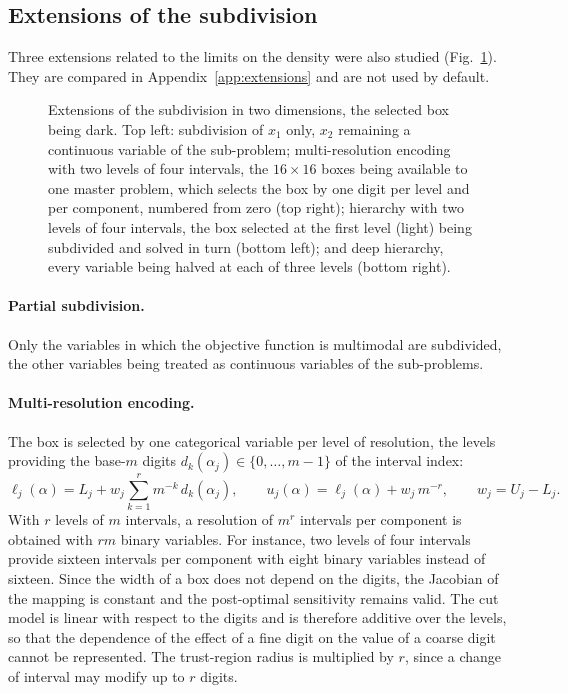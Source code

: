 \documentclass[pdflatex,sn-basic]{sn-jnl}
\newenvironment{appendices}{\appendix}{}
\begin{document}
\begin{appendices}
\subsection{Extensions of the subdivision}\label{sec:extensions}

Three extensions related to the limits on the density were also studied
(Fig.~\ref{fig:subdivision-variants}). They are compared in
Appendix~\ref{app:extensions} and are not used by default.

\begin{figure}[t]
  \centering
  
  \caption{Extensions of the subdivision in two dimensions, the selected box
    being dark. Top left: subdivision of $x_1$ only, $x_2$ remaining a
    continuous variable of the sub-problem; multi-resolution encoding with two
    levels of four intervals, the $16 \times 16$ boxes being available to one
    master problem, which selects the box by one digit per level and per
    component, numbered from zero (top right); hierarchy with two levels of four
    intervals, the box selected at the first level (light) being subdivided and
    solved in turn (bottom left); and deep hierarchy, every variable being
    halved at each of three levels (bottom right).}
  \label{fig:subdivision-variants}
\end{figure}

\paragraph{Partial subdivision.} Only the variables in which the objective
function is multimodal are subdivided, the other variables being treated as
continuous variables of the sub-problems.

\paragraph{Multi-resolution encoding.} The box is selected by one categorical
variable per level of resolution, the levels providing the base-$m$ digits
$d_k(\alpha_j) \in \{0,\dots,m-1\}$ of the interval index:
\begin{equation}\label{eq:multires}
  \ell_j(\alpha) = L_j + w_j \sum_{k=1}^{r} m^{-k}\, d_k(\alpha_j),
  \qquad
  u_j(\alpha) = \ell_j(\alpha) + w_j\, m^{-r},
  \qquad w_j = U_j - L_j .
\end{equation}
With $r$ levels of $m$ intervals, a resolution of $m^r$ intervals per component
is obtained with $rm$ binary variables. For instance, two levels of four
intervals provide sixteen intervals per component with eight binary variables
instead of sixteen. Since the width of a box does not depend on the digits, the
Jacobian of the mapping is constant and the post-optimal sensitivity remains
valid. The cut model is linear with respect to the digits and is therefore
additive over the levels, so that the dependence of the effect of a fine digit
on the value of a coarse digit cannot be represented. The trust-region radius is
multiplied by $r$, since a change of interval may modify up to $r$ digits.


\end{appendices}
\end{document}
